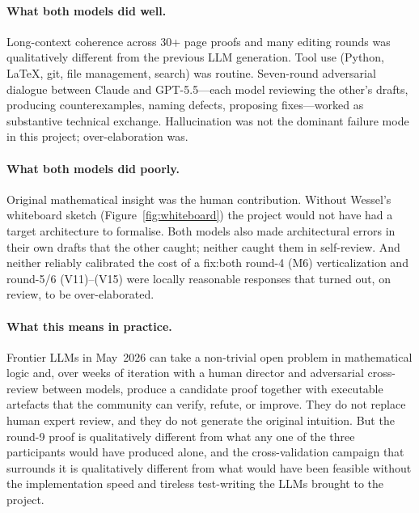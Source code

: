 \documentclass[
]{ceurart}
\theoremstyle{definition}
\begin{document}
\paragraph{What both models did well.}  Long-context coherence
across 30+ page proofs and many editing rounds was qualitatively
different from the previous LLM generation.  Tool use (Python,
\LaTeX, git, file management, search) was routine.  Seven-round
adversarial dialogue between Claude and GPT-5.5---each model
reviewing the other's drafts, producing counterexamples, naming
defects, proposing fixes---worked as substantive technical
exchange.  Hallucination was not the dominant failure mode in
this project; over-elaboration was.

\paragraph{What both models did poorly.}  Original mathematical
insight was the human contribution.  Without Wessel's whiteboard
sketch (Figure~\ref{fig:whiteboard}) the project would not have
had a target architecture to formalise.  Both models also made
architectural errors in their own drafts that the other caught;
neither caught them in self-review.  And neither reliably
calibrated the cost of a fix:\@ both round-4 (M6) verticalization
and round-5/6 (V11)--(V15) were locally reasonable responses
that turned out, on review, to be over-elaborated.

\paragraph{What this means in practice.}
Frontier LLMs in May~2026 can take a non-trivial open problem in
mathematical logic and, over weeks of iteration with a human
director and adversarial cross-review between models, produce a
candidate proof together with executable artefacts that the
community can verify, refute, or improve.  They do not replace
human expert review, and they do not generate the original
intuition.  But the round-9 proof is qualitatively different from
what any one of the three participants would have produced alone,
and the cross-validation campaign that surrounds it is
qualitatively different from what would have been feasible without
the implementation speed and tireless test-writing the LLMs
brought to the project.
\end{document}
